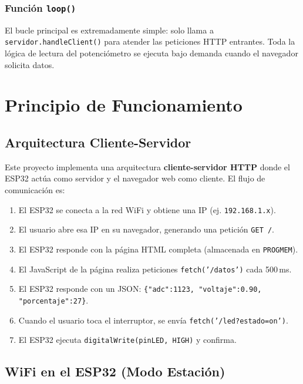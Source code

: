\documentclass[12pt,a4paper]{article}
\begin{document}
\subsubsection*{Función \texttt{loop()}}

El bucle principal es extremadamente simple: solo llama a \texttt{servidor.handleClient()} para atender las peticiones HTTP entrantes. Toda la lógica de lectura del potenciómetro se ejecuta bajo demanda cuando el navegador solicita datos.

\section{Principio de Funcionamiento}

\subsection{Arquitectura Cliente-Servidor}

Este proyecto implementa una arquitectura \textbf{cliente-servidor HTTP} donde el ESP32 actúa como servidor y el navegador web como cliente. El flujo de comunicación es:

\begin{enumerate}
    \item El ESP32 se conecta a la red WiFi y obtiene una IP (ej. \texttt{192.168.1.x}).
    \item El usuario abre esa IP en su navegador, generando una petición \texttt{GET /}.
    \item El ESP32 responde con la página HTML completa (almacenada en \texttt{PROGMEM}).
    \item El JavaScript de la página realiza peticiones \texttt{fetch('/datos')} cada 500\,ms.
    \item El ESP32 responde con un JSON: \texttt{\{"adc":1123, "voltaje":0.90, "porcentaje":27\}}.
    \item Cuando el usuario toca el interruptor, se envía \texttt{fetch('/led?estado=on')}.
    \item El ESP32 ejecuta \texttt{digitalWrite(pinLED, HIGH)} y confirma.
\end{enumerate}

\subsection{WiFi en el ESP32 (Modo Estación)}
\end{document}
